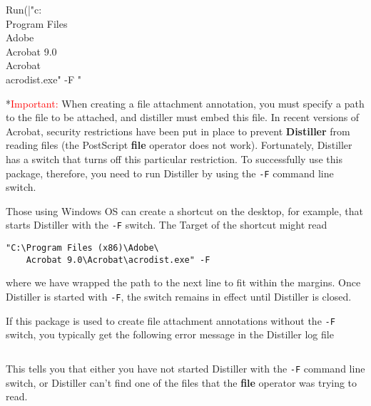 \documentclass[12pt]{article}
\makeatletter
\let\app\textsf
\let\uif\textsf
\renewcommand*{\theparagraph}{\texorpdfstring{\protect\P\protect\ }{\textparagraph}}
\renewcommand{\paragraph}
    {\renewcommand{\@seccntformat}[1]{\theparagraph}%
    \@startsection{paragraph}{4}{0pt}{6pt}{-3pt}{\color{\aeb@subsubsectioncolor}\bfseries}}
\makeatother
\begin{document}
\begin{defineJS}{\winedtDist}
Run(|"c:\\Program Files\\Adobe\\Acrobat 9.0\\Acrobat\\acrodist.exe" -F "%
\end{defineJS}

\paragraph*{\textcolor{red}{Important:}} When creating a file attachment annotation,
you must specify a path to the file to be attached, and distiller must embed
this file.  In recent versions of Acrobat,
security restrictions have been put in place to prevent
\textbf{Distiller} from reading files (the PostScript \textbf{file}
operator does not work). Fortunately, Distiller has a switch that
turns off this particular restriction. To successfully use this
package, therefore, you need to run Distiller by using the
\texttt{-F} command line switch.


Those using \app{Windows OS} can create a shortcut on the desktop, for example,
that starts \app{Distiller} with the \texttt{-F} switch. The \uif{Target} of the shortcut might read
\begin{Verbatim}[xleftmargin=\leftmargini,fontsize=\small]
"C:\Program Files (x86)\Adobe\
    Acrobat 9.0\Acrobat\acrodist.exe" -F
\end{Verbatim}
where we have wrapped the path to the next line to fit within the margins.
Once \app{Distiller} is started with \texttt{-F}, the switch remains in effect
until \app{Distiller} is closed.

If this package is used to create file attachment annotations without the
\texttt{-F} switch, you typically get the following error message in
the Distiller log file
\begin{Verbatim}[xleftmargin=\leftmargini,fontsize=\small]
%%[ Error: undefinedfilename; OffendingCommand: file ]%%
\end{Verbatim}
This tells you that either you have not started Distiller with the
\texttt{-F} command line switch, or Distiller can't find one of the
files that the \textbf{file} operator was trying to read.
\end{document}
